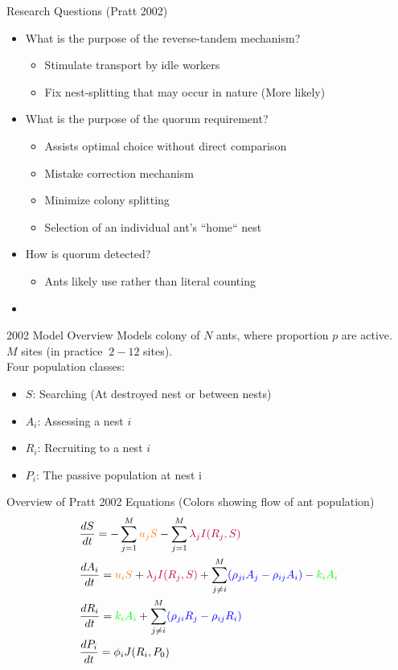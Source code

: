 \documentclass{beamer}
\makeatletter
\def\mcolor#1#{\@mcolor{#1}}
\def\@mcolor#1#2#3{%
  \protect\leavevmode
  \begingroup
    \color#1{#2}#3%
  \endgroup
}
\newcommand{\sitem}[1]
{
    \begin{itemize}
        \item #1
    \end{itemize}
}
\makeatother
\begin{document}
  \begin{frame}{Research Questions (Pratt 2002)}
      \begin{itemize}
          \item What is the purpose of the reverse-tandem mechanism?
              \sitem{Stimulate transport by idle workers}
              \sitem{Fix nest-splitting that may occur in nature (More likely)}
          \item What is the purpose of the quorum requirement?
              \sitem{Assists optimal choice without direct comparison}
              \sitem{Mistake correction mechanism}
              \sitem{Minimize colony splitting}
              \sitem{Selection of an individual ant's ``home`` nest}
          \item How is quorum detected?
              \sitem{Ants likely use  rather than literal counting}
          \item {}
      \end{itemize}
  \end{frame}

  \begin{frame}{2002 Model Overview}
      Models colony of $N$ ants, where proportion $p$ are active. \\
      $M$ sites (in practice $~2-12$ sites). \\
      Four population classes: 
      \begin{itemize}
          \item $S$: Searching (At destroyed nest or between nests) 
          \item $A_i$: Assessing a nest $i$ 
          \item $R_i$: Recruiting to a nest $i$ 
          \item $P_i$: The passive population at nest i 
      \end{itemize}
  \end{frame}


  \begin{frame}{Overview of Pratt 2002 Equations (Colors showing flow of ant population)}
      \Large
      \begin{equation}
      \begin{aligned}
          & \frac{dS}{dt} = - \sum_{j=1}^M \mcolor{orange}{u_jS} - \sum_{j=1}^M \mcolor{purple}{\lambda_jI(R_j, S)} \\
          & \frac{dA_i}{dt} = \mcolor{orange}{u_iS} + \mcolor{purple}{\lambda_jI(R_j, S)} + \sum_{j \neq i}^M \mcolor{blue}{(\rho_{ji}A_j - \rho_{ij}A_i)} - \mcolor{green}{k_iA_i} \\
          & \frac{dR_i}{dt} = \mcolor{green}{k_iA_i} + \sum_{j \neq i}^M \mcolor{blue}{(\rho_{ji}R_j - \rho_{ij}R_i)} \\
          & \frac{dP_i}{dt} = \phi_iJ(R_i, P_0)
      \end{aligned}
      \end{equation}
  \end{frame}
\end{document}
